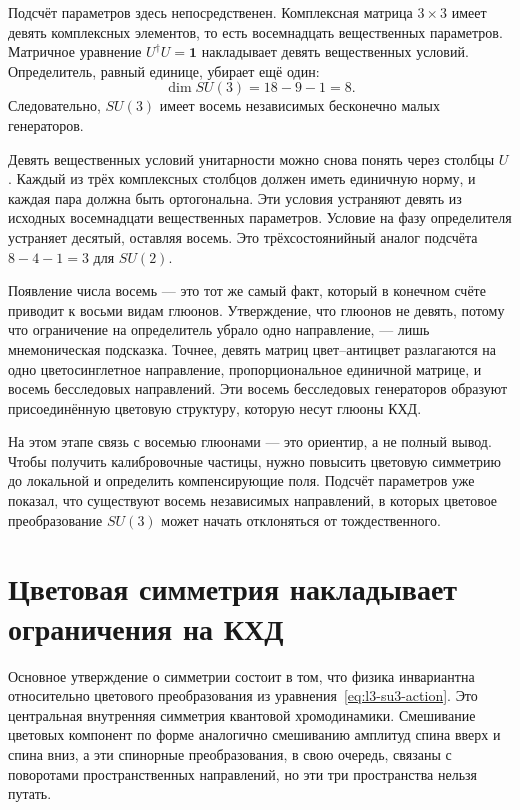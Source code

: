 Подсчёт параметров здесь непосредственен. Комплексная матрица \(3\times3\) имеет девять комплексных элементов, то есть восемнадцать вещественных параметров. Матричное уравнение \(U^\dagger U=\boldsymbol 1\) накладывает девять вещественных условий. Определитель, равный единице, убирает ещё один:
\begin{equation}
\dim SU(3)=18-9-1=8.
\end{equation}
Следовательно, \(SU(3)\) имеет восемь независимых бесконечно малых генераторов.

Девять вещественных условий унитарности можно снова понять через столбцы \(U\). Каждый из трёх комплексных столбцов должен иметь единичную норму, и каждая пара должна быть ортогональна. Эти условия устраняют девять из исходных восемнадцати вещественных параметров. Условие на фазу определителя устраняет десятый, оставляя восемь. Это трёхсостоянийный аналог подсчёта \(8-4-1=3\) для \(SU(2)\).

Появление числа восемь — это тот же самый факт, который в конечном счёте приводит к восьми видам глюонов. Утверждение, что глюонов не девять, потому что ограничение на определитель убрало одно направление, — лишь мнемоническая подсказка. Точнее, девять матриц цвет–антицвет разлагаются на одно цветосинглетное направление, пропорциональное единичной матрице, и восемь бесследовых направлений. Эти восемь бесследовых генераторов образуют присоединённую цветовую структуру, которую несут глюоны КХД.

На этом этапе связь с восемью глюонами — это ориентир, а не полный вывод. Чтобы получить калибровочные частицы, нужно повысить цветовую симметрию до локальной и определить компенсирующие поля. Подсчёт параметров уже показал, что существуют восемь независимых направлений, в которых цветовое преобразование \(SU(3)\) может начать отклоняться от тождественного.

\section{Цветовая симметрия накладывает ограничения на КХД}

Основное утверждение о симметрии состоит в том, что физика инвариантна относительно цветового преобразования из уравнения~\eqref{eq:l3-su3-action}. Это центральная внутренняя симметрия квантовой хромодинамики. Смешивание цветовых компонент по форме аналогично смешиванию амплитуд спина вверх и спина вниз, а эти спинорные преобразования, в свою очередь, связаны с поворотами пространственных направлений, но эти три пространства нельзя путать.

